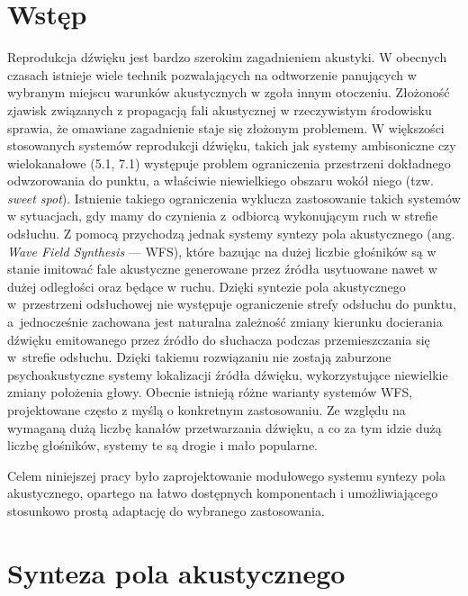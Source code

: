\documentclass[10pt, a4paper]{article}
\let\Oldsection\section
\renewcommand{\section}{\FloatBarrier\Oldsection}
\begin{document}
\section{Wstęp}

Reprodukcja dźwięku jest bardzo szerokim zagadnieniem akustyki. W obecnych
czasach istnieje wiele technik pozwalających na odtworzenie panujących w
wybranym miejscu warunków akustycznych w zgoła innym otoczeniu. Złożoność
zjawisk związanych z propagacją fali akustycznej w rzeczywistym środowisku
sprawia, że omawiane zagadnienie staje się złożonym problemem.  W większości
stosowanych systemów reprodukcji dźwięku, takich jak systemy ambisoniczne czy
wielokanałowe (5.1, 7.1) występuje problem ograniczenia przestrzeni dokładnego
odwzorowania do punktu, a właściwie niewielkiego obszaru wokół niego (tzw.
\textit{sweet spot}).
Istnienie takiego ograniczenia wyklucza zastosowanie takich systemów w
sytuacjach, gdy mamy do czynienia z~odbiorcą wykonującym ruch w strefie
odsłuchu. Z pomocą przychodzą jednak systemy syntezy pola akustycznego (ang.
\textit{Wave Field Synthesis} --- WFS), które bazując na dużej liczbie
głośników są w stanie imitować fale akustyczne generowane przez źródła
usytuowane nawet w dużej odległości oraz będące w ruchu. Dzięki syntezie pola
akustycznego w~przestrzeni odsłuchowej nie występuje ograniczenie strefy
odsłuchu do punktu, a~jednocześnie zachowana jest naturalna zależność zmiany
kierunku docierania dźwięku emitowanego przez źródło do słuchacza podczas
przemieszczania się w~strefie odsłuchu. Dzięki takiemu rozwiązaniu nie zostają
zaburzone psychoakustyczne systemy lokalizacji źródła dźwięku, wykorzystujące
niewielkie zmiany położenia głowy. Obecnie istnieją różne warianty systemów
WFS, projektowane często z myślą o konkretnym zastosowaniu. Ze względu na
wymaganą dużą liczbę kanałów przetwarzania dźwięku, a co za tym idzie dużą
liczbę głośników, systemy te są drogie i mało popularne. 

Celem niniejszej pracy było zaprojektowanie modułowego systemu syntezy pola
akustycznego, opartego na łatwo dostępnych komponentach i umożliwiającego
stosunkowo prostą adaptację do wybranego zastosowania.

\section{Synteza pola akustycznego}
\end{document}
